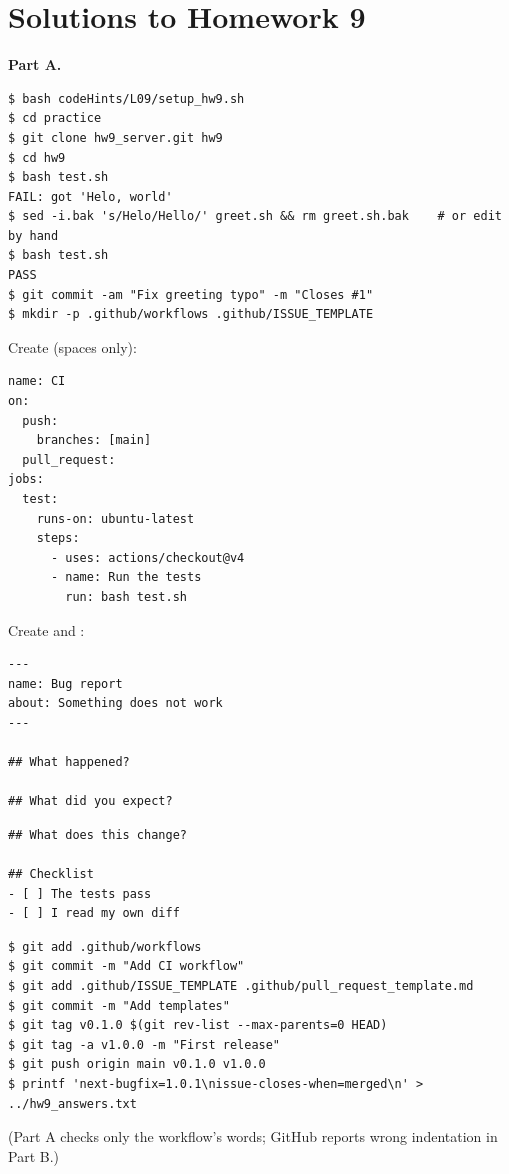 \section*{Solutions to Homework 9}

\textbf{Part A.}

\begin{lstlisting}
$ bash codeHints/L09/setup_hw9.sh
$ cd practice
$ git clone hw9_server.git hw9
$ cd hw9
$ bash test.sh
FAIL: got 'Helo, world'
$ sed -i.bak 's/Helo/Hello/' greet.sh && rm greet.sh.bak    # or edit by hand
$ bash test.sh
PASS
$ git commit -am "Fix greeting typo" -m "Closes #1"
$ mkdir -p .github/workflows .github/ISSUE_TEMPLATE
\end{lstlisting}

Create  (spaces only):

\begin{lstlisting}
name: CI
on:
  push:
    branches: [main]
  pull_request:
jobs:
  test:
    runs-on: ubuntu-latest
    steps:
      - uses: actions/checkout@v4
      - name: Run the tests
        run: bash test.sh
\end{lstlisting}

Create  and :

\begin{lstlisting}
---
name: Bug report
about: Something does not work
---

## What happened?

## What did you expect?
\end{lstlisting}

\begin{lstlisting}
## What does this change?

## Checklist
- [ ] The tests pass
- [ ] I read my own diff
\end{lstlisting}

\begin{lstlisting}
$ git add .github/workflows
$ git commit -m "Add CI workflow"
$ git add .github/ISSUE_TEMPLATE .github/pull_request_template.md
$ git commit -m "Add templates"
$ git tag v0.1.0 $(git rev-list --max-parents=0 HEAD)
$ git tag -a v1.0.0 -m "First release"
$ git push origin main v0.1.0 v1.0.0
$ printf 'next-bugfix=1.0.1\nissue-closes-when=merged\n' > ../hw9_answers.txt
\end{lstlisting}

(Part A checks only the workflow's words; GitHub reports wrong indentation in Part B.)

